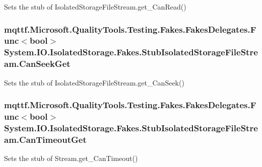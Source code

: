 Sets the stub of Isolated\-Storage\-File\-Stream.\-get\-\_\-\-Can\-Read()

\hypertarget{class_system_1_1_i_o_1_1_isolated_storage_1_1_fakes_1_1_stub_isolated_storage_file_stream_a7bb22d3783f50b68992aede70bd1f092}{
\subsubsection[{Can\-Seek\-Get}]{\setlength{\rightskip}{0pt plus 5cm}mqttf.\-Microsoft.\-Quality\-Tools.\-Testing.\-Fakes.\-Fakes\-Delegates.\-Func$<$bool$>$ System.\-I\-O.\-Isolated\-Storage.\-Fakes.\-Stub\-Isolated\-Storage\-File\-Stream.\-Can\-Seek\-Get}}\label{class_system_1_1_i_o_1_1_isolated_storage_1_1_fakes_1_1_stub_isolated_storage_file_stream_a7bb22d3783f50b68992aede70bd1f092}


Sets the stub of Isolated\-Storage\-File\-Stream.\-get\-\_\-\-Can\-Seek()

\hypertarget{class_system_1_1_i_o_1_1_isolated_storage_1_1_fakes_1_1_stub_isolated_storage_file_stream_a33d39f6710a92a453805c821b432478b}{
\subsubsection[{Can\-Timeout\-Get}]{\setlength{\rightskip}{0pt plus 5cm}mqttf.\-Microsoft.\-Quality\-Tools.\-Testing.\-Fakes.\-Fakes\-Delegates.\-Func$<$bool$>$ System.\-I\-O.\-Isolated\-Storage.\-Fakes.\-Stub\-Isolated\-Storage\-File\-Stream.\-Can\-Timeout\-Get}}\label{class_system_1_1_i_o_1_1_isolated_storage_1_1_fakes_1_1_stub_isolated_storage_file_stream_a33d39f6710a92a453805c821b432478b}


Sets the stub of Stream.\-get\-\_\-\-Can\-Timeout()

